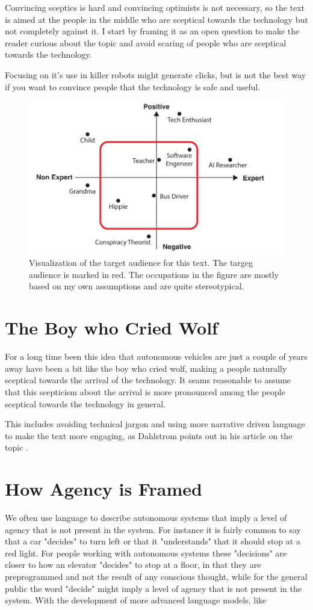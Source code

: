 \documentclass{iopconfser}
\begin{document}
Convincing sceptics is hard and convincing optimists is not necessary, so the text is aimed at the people in the middle who are sceptical towards the technology but not completely against it.
I start by framing it as an open question to make the reader curious about the topic and avoid scaring of people who are sceptical towards the technology.


Focusing on it's use in killer robots might generate clicks, but is not the best way if you want to convince people that the technology is safe and useful.


\begin{figure}[H]
    \centering
    \includegraphics[width=.8\textwidth]{figures/overview.pdf}
    \caption{Visualization of the target audience for this text. The targeg audience is marked in red. The occupations in the figure are mostly based on my own assumptions and are quite stereotypical.}
\end{figure}

\section*{The Boy who Cried Wolf}
For a long time been this idea that autonomous vehicles are just a couple of years away have been a bit like the boy who cried wolf, making a people naturally sceptical towards the arrival of the technology. 
It seams reasonable to assume that this scepticism about the arrival is more pronounced among the people sceptical towards the technology in general.


This includes avoiding technical jargon and using more narrative driven language to make the text more engaging, as Dahlstrom points out in his article on the topic \cite{dahlstromUsingNarrativesStorytelling2014}.

\section*{How Agency is Framed}
We often use language to describe autonomous systems that imply a level of agency that is not present in the system.
For instance it is fairly common to say that a car "decides" to turn left or that it "understands" that it should stop at a red light.
For people working with autonomous systems these "decisions" are closer to how an elevator "decides" to stop at a floor, in that they are preprogrammed and not the result of any conscious thought, while for the general public the word "decide" might imply a level of agency that is not present in the system.
With the development of more advanced language models, like 
\end{document}
